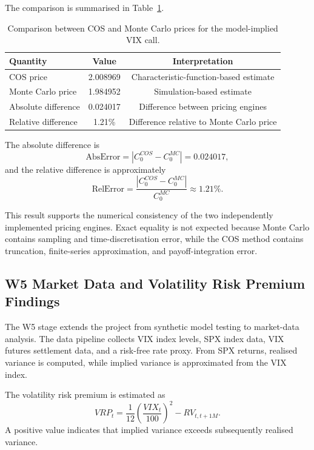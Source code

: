 The comparison is summarised in Table~\ref{tab:cos_mc_comparison}.

\begin{table}[htbp]
\centering
\begin{tabular}{lcc}
\toprule
Quantity & Value & Interpretation \\
\midrule
COS price & 2.008969 & Characteristic-function-based estimate \\
Monte Carlo price & 1.984952 & Simulation-based estimate \\
Absolute difference & 0.024017 & Difference between pricing engines \\
Relative difference & 1.21\% & Difference relative to Monte Carlo price \\
\bottomrule
\end{tabular}
\caption{Comparison between COS and Monte Carlo prices for the model-implied VIX call.}
\label{tab:cos_mc_comparison}
\end{table}

The absolute difference is
\begin{equation}
\mathrm{AbsError}
=
|C_0^{COS}-C_0^{MC}|
=
0.024017,
\end{equation}
and the relative difference is approximately
\begin{equation}
\mathrm{RelError}
=
\frac{|C_0^{COS}-C_0^{MC}|}{C_0^{MC}}
\approx
1.21\%.
\end{equation}

This result supports the numerical consistency of the two independently implemented pricing engines. Exact equality is not expected because Monte Carlo contains sampling and time-discretisation error, while the COS method contains truncation, finite-series approximation, and payoff-integration error.

\subsection{W5 Market Data and Volatility Risk Premium Findings}

The W5 stage extends the project from synthetic model testing to market-data analysis. The data pipeline collects VIX index levels, SPX index data, VIX futures settlement data, and a risk-free rate proxy. From SPX returns, realised variance is computed, while implied variance is approximated from the VIX index.

The volatility risk premium is estimated as
\begin{equation}
VRP_t
=
\frac{1}{12}
\left(
\frac{VIX_t}{100}
\right)^2
-
RV_{t,t+1M}.
\end{equation}
A positive value indicates that implied variance exceeds subsequently realised variance.

